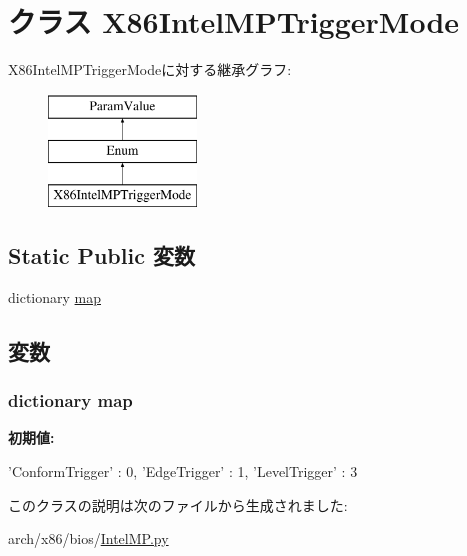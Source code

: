 \hypertarget{classIntelMP_1_1X86IntelMPTriggerMode}{
\section{クラス X86IntelMPTriggerMode}
\label{classIntelMP_1_1X86IntelMPTriggerMode}
}
X86IntelMPTriggerModeに対する継承グラフ:\begin{figure}[H]
\begin{center}
\leavevmode
\includegraphics[height=3cm]{classIntelMP_1_1X86IntelMPTriggerMode}
\end{center}
\end{figure}
\subsection*{Static Public 変数}
\begin{DoxyCompactItemize}
\item 
dictionary \hyperlink{classIntelMP_1_1X86IntelMPTriggerMode_aca70ca58dda85cf4fe7a0737ec18e004}{map}
\end{DoxyCompactItemize}


\subsection{変数}
\hypertarget{classIntelMP_1_1X86IntelMPTriggerMode_aca70ca58dda85cf4fe7a0737ec18e004}{
\subsubsection[{map}]{\setlength{\rightskip}{0pt plus 5cm}dictionary {\bf map}}}
\label{classIntelMP_1_1X86IntelMPTriggerMode_aca70ca58dda85cf4fe7a0737ec18e004}
{\bfseries 初期値:}
\begin{DoxyCode}
{'ConformTrigger' : 0,
           'EdgeTrigger' : 1,
           'LevelTrigger' : 3
    }
\end{DoxyCode}


このクラスの説明は次のファイルから生成されました:\begin{DoxyCompactItemize}
\item 
arch/x86/bios/\hyperlink{IntelMP_8py}{IntelMP.py}\end{DoxyCompactItemize}
